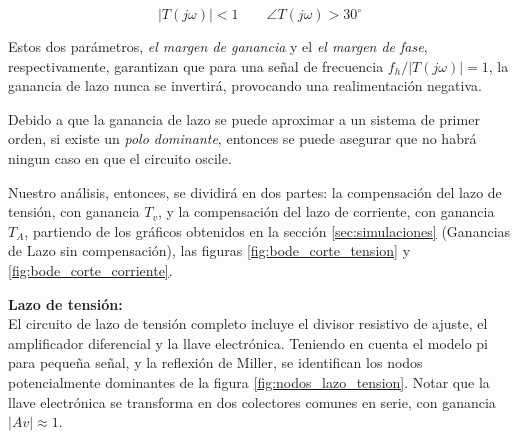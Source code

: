 \documentclass[]{article}
\begin{document}
	\begin{equation}
		|T(j\omega)| < 1 \qquad \angle T(j\omega) > 30^\circ
	\end{equation}
	
	Estos dos parámetros, \textit{el margen de ganancia} y el \textit{el margen de fase}, respectivamente, garantizan que para una señal de frecuencia $f_h \Big/ |T(j\omega)| = 1$, la ganancia de lazo nunca se invertirá, provocando una realimentación negativa.
	
	Debido a que la ganancia de lazo se puede aproximar a un sistema de primer orden, si existe un \textit{polo dominante}, entonces se puede asegurar que no habrá ningun caso en que el circuito oscile.
	
	Nuestro análisis, entonces, se dividirá en dos partes: la compensación del lazo de tensión, con ganancia $T_v$, y la compensación del lazo de corriente, con ganancia $T_A$, partiendo de los gráficos obtenidos en la sección \ref{sec:simulaciones} (Ganancias de Lazo sin compensación), las figuras \ref{fig:bode_corte_tension} y \ref{fig:bode_corte_corriente}.
	
	\textbf{Lazo de tensión:}\\
	
	El circuito de lazo de tensión completo incluye el divisor resistivo de ajuste, el amplificador diferencial y la llave electrónica. Teniendo en cuenta el modelo pi para pequeña señal, y la reflexión de Miller, se identifican los nodos potencialmente dominantes de la figura \ref{fig:nodos_lazo_tension}. Notar que la llave electrónica se transforma en dos colectores comunes en serie, con ganancia $|Av| \approx 1$.
	
\end{document}
